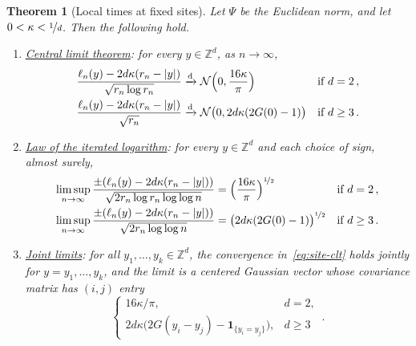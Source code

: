 \documentclass[11pt]{amsart}
\theoremstyle{plain}
\newtheorem{theorem}{Theorem}[section]
\theoremstyle{definition}
\newcommand{\Z}{\mathbb Z}
\newcommand{\drift}{\kappa}
\newcommand{\gauge}{\Psi}
\newcommand{\ind}{\mathbf 1}
\newcommand{\nf}{\nicefrac}
\numberwithin{equation}{section}
\begin{document}
\begin{theorem}[Local times at fixed sites]\label{thm:site-fluctuations}
Let $\gauge$ be the Euclidean norm, and let $0<\drift<\nf1d$. Then the following hold.
\begin{enumerate}[label=\textup{(\roman*)}]
\item \underline{\emph{Central limit theorem}}: for every $y\in\Z^d$, as $n\to\infty$,
\begin{equation}\label{eq:site-clt}
\begin{aligned}
\frac{\ell_n(y)-2d\drift(r_n-|y|)}{\sqrt{r_n\log r_n}}&\xrightarrow{\mathrm d}\mathcal N\Bigl(0,\frac{16\drift}{\pi}\Bigr)&&\text{if } d=2\, ,\\
\frac{\ell_n(y)-2d\drift(r_n-|y|)}{\sqrt{r_n}}&\xrightarrow{\mathrm d}\mathcal N\bigl(0,2d\drift(2G(0)-1)\bigr)&&\text{if } d\geq3\, .
\end{aligned}
\end{equation}
\item \underline{\emph{Law of the iterated logarithm}}: for every $y\in\Z^d$ and each choice of sign, almost surely,
\begin{equation*}
\begin{aligned}
\limsup_{n\to\infty}\frac{\pm(\ell_n(y)-2d\drift(r_n-|y|))}{\sqrt{2r_n\log r_n\log\log n}}&=\Bigl(\frac{16\drift}{\pi}\Bigr)^{\nf12}&&\text{if } d=2\, ,\\
\limsup_{n\to\infty}\frac{\pm(\ell_n(y)-2d\drift(r_n-|y|))}{\sqrt{2r_n\log\log n}}&=\bigl(2d\drift(2G(0)-1)\bigr)^{\nf12}&&\text{if } d\geq3\, .
\end{aligned}
\end{equation*}
\item \underline{\emph{Joint limits}}: for all $y_1,\ldots,y_k\in\Z^d$, the convergence in~\eqref{eq:site-clt} holds jointly for $y=y_1,\ldots,y_k$, and the limit is a centered Gaussian vector whose covariance matrix has $(i,j)$ entry
\begin{equation}\label{eq:site-covariance}
\begin{cases}
16\drift/\pi,&d=2,\\
2d\drift\bigl(2G(y_i-y_j)-\ind_{\{y_i=y_j\}}\bigr),&d\geq3
\end{cases}\, .
\end{equation}
\end{enumerate}
\end{theorem}
\end{document}
